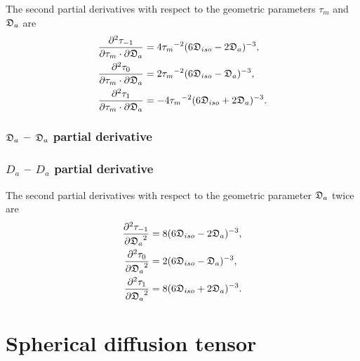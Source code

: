 The second partial derivatives with respect to the geometric parameters $\tau_m$ and $\mathfrak{D}_a$ are
\begin{subequations}
\begin{align}
    \frac{\partial^2 \tau_{-1}}{\partial \tau_m \cdot \partial \mathfrak{D}_a} &= 4{\tau_m}^{-2} (6\mathfrak{D}_{iso} - 2\mathfrak{D}_a)^{-3}, \\
    \frac{\partial^2 \tau_{0}}{\partial \tau_m \cdot \partial \mathfrak{D}_a}  &= 2{\tau_m}^{-2} (6\mathfrak{D}_{iso} - \mathfrak{D}_a)^{-3}, \\
    \frac{\partial^2 \tau_{1}}{\partial \tau_m \cdot \partial \mathfrak{D}_a}  &= -4{\tau_m}^{-2} (6\mathfrak{D}_{iso} + 2\mathfrak{D}_a)^{-3}.
\end{align}
\end{subequations}



\begin{latexonly}
    \subsubsection{$\mathfrak{D}_a$ -- $\mathfrak{D}_a$ partial derivative}
\end{latexonly}
\begin{htmlonly}
    \subsubsection{$D_a$ -- $D_a$ partial derivative}
\end{htmlonly}

The second partial derivatives with respect to the geometric parameter $\mathfrak{D}_a$ twice are
\begin{subequations}
\begin{align}
    \frac{\partial^2 \tau_{-1}}{{\partial \mathfrak{D}_a}^2} &= 8 (6\mathfrak{D}_{iso} - 2\mathfrak{D}_a)^{-3}, \\
    \frac{\partial^2 \tau_{0}}{{\partial \mathfrak{D}_a}^2}  &= 2 (6\mathfrak{D}_{iso} - \mathfrak{D}_a)^{-3}, \\
    \frac{\partial^2 \tau_{1}}{{\partial \mathfrak{D}_a}^2}  &= 8 (6\mathfrak{D}_{iso} + 2\mathfrak{D}_a)^{-3}.
\end{align}
\end{subequations}





\newpage
\section{Spherical diffusion tensor}

